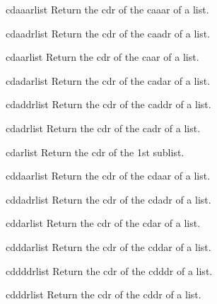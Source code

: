 \begin{accessor}{cdaaar}{list}{}
  Return the cdr of the caaar of a list.
\end{accessor}

\begin{accessor}{cdaadr}{list}{}
  Return the cdr of the caadr of a list.
\end{accessor}

\begin{accessor}{cdaar}{list}{}
  Return the cdr of the caar of a list.
\end{accessor}

\begin{accessor}{cdadar}{list}{}
  Return the cdr of the cadar of a list.
\end{accessor}

\begin{accessor}{cdaddr}{list}{}
  Return the cdr of the caddr of a list.
\end{accessor}

\begin{accessor}{cdadr}{list}{}
  Return the cdr of the cadr of a list.
\end{accessor}

\begin{accessor}{cdar}{list}{}
  Return the cdr of the 1st sublist.
\end{accessor}

\begin{accessor}{cddaar}{list}{}
  Return the cdr of the cdaar of a list.
\end{accessor}

\begin{accessor}{cddadr}{list}{}
  Return the cdr of the cdadr of a list.
\end{accessor}

\begin{accessor}{cddar}{list}{}
  Return the cdr of the cdar of a list.
\end{accessor}

\begin{accessor}{cdddar}{list}{}
  Return the cdr of the cddar of a list.
\end{accessor}

\begin{accessor}{cddddr}{list}{}
  Return the cdr of the cdddr of a list.
\end{accessor}

\begin{accessor}{cdddr}{list}{}
  Return the cdr of the cddr of a list.
\end{accessor}

